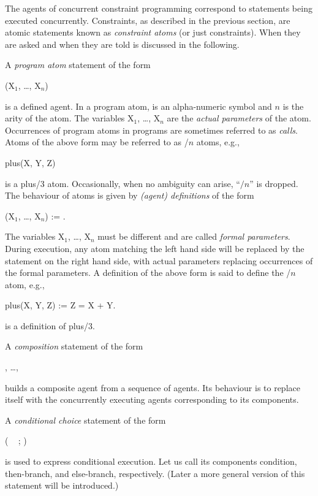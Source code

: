 The agents of concurrent constraint programming correspond to
statements being executed concurrently.  Constraints, as described in
the previous section, are atomic statements known as {\em constraint
atoms} (or just constraints).  When they are asked and when they are
told is discussed in the following.

A {\em program atom} statement of the form
%
\begin{progex}
(X$_1$, \dots, X$_n$)
\end{progex}%
%
is a defined agent.  In a program atom,  is an alpha-numeric
symbol and $n$ is the arity of the atom.  The variables {\prog X$_1$,
\dots, X$_n$} are the {\em actual parameters} of the atom.  Occurrences of
program atoms in programs are sometimes referred to as {\em calls}.
Atoms of the above form may be referred to as {\prog {}/$n$}
atoms, e.g.,
%
\begin{progex}
plus(X, Y, Z)
\end{progex}%
%
is a {\prog plus/3} atom.  Occasionally, when no ambiguity can arise,
``$/n$'' is dropped.  The behaviour of atoms is given by {\em (agent)
definitions} of the form
%
\begin{progex}
(X$_1$, \dots, X$_n$) := .
\end{progex}%
%
The variables {\prog X$_1$, \dots, X$_n$} must be different and are
called {\em formal parameters}.  During execution, any atom matching
the left hand side will be replaced by the statement on the right hand
side, with actual parameters replacing occurrences of the formal
parameters.  A definition of the above form is said to define the
{\prog {}/$n$} atom, e.g.,
%
\begin{progex}
plus(X, Y, Z) := Z = X + Y.
\end{progex}%
%
is a definition of {\prog plus/3}.

A {\em composition} statement of the form
%
\begin{progex}
, \dots, 
\end{progex}%
%
builds a composite agent from a sequence of agents.  Its behaviour is
to replace itself with the concurrently executing agents corresponding
to its components.

A {\em conditional choice} statement of the form
%
\begin{progex}
( \cond\  ; )
\end{progex}%
%
is used to express conditional execution.  Let us call its components
condition, then-branch, and else-branch, respectively.  (Later a more
general version of this statement will be introduced.)

